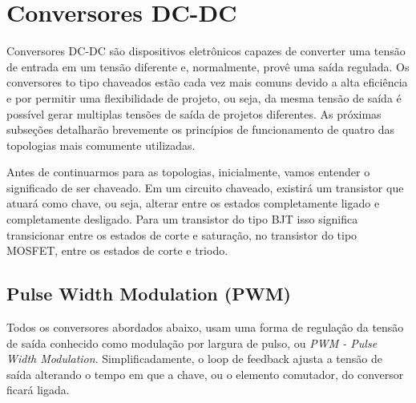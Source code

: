 \section{Conversores DC-DC}\label{converters_revision}
Conversores DC-DC \cite{ti_whitepaper}\cite{power_electronics_hart} são dispositivos eletrônicos capazes de converter uma tensão de entrada em um tensão diferente e, normalmente, provê uma saída regulada. Os conversores to tipo chaveados estão cada vez mais comuns devido a alta eficiência e por permitir uma flexibilidade de projeto, ou seja, da mesma tensão de saída é possível gerar multiplas tensões de saída de projetos diferentes. As próximas subseções detalharão brevemente os princípios de funcionamento de quatro das topologias mais comumente utilizadas.


Antes de continuarmos para as topologias, inicialmente, vamos entender o significado de ser chaveado. Em um circuito chaveado, existirá um transistor que atuará como chave, ou seja, alterar entre os estados completamente ligado e completamente desligado. Para um transistor do tipo BJT isso significa transicionar entre os estados de corte e saturação, no transistor do tipo MOSFET, entre os estados de corte e triodo. 

\subsection*{Pulse Width Modulation (PWM)}
Todos os conversores abordados abaixo, usam uma forma de regulação da tensão de saída conhecido como modulação por largura de pulso, ou \textit{PWM - Pulse Width Modulation}. Simplificadamente, o loop de feedback ajusta a tensão de saída alterando o tempo em que a chave, ou o elemento comutador, do conversor ficará ligada.

\noindent
\begin{minipage}{\linewidth}
\label{PWM_sample_fig}
\end{minipage}

